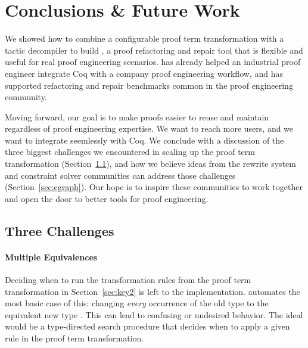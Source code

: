 \section{Conclusions \& Future Work}
\label{sec:discussion}

We showed how to combine a configurable proof term transformation with a tactic decompiler to build \toolname,
a proof refactoring and repair tool that is flexible and useful for real proof engineering scenarios.
\toolname has already helped an industrial proof engineer integrate Coq with a company proof engineering workflow,
and has supported refactoring and repair benchmarks common in the proof engineering community.

Moving forward, our goal is to make proofs easier to reuse and maintain regardless of proof engineering expertise.
We want to reach more users, and we want \toolname to integrate seemlessly with Coq.
We conclude with a discussion of the three biggest challenges we encountered in scaling up the \toolname proof term 
transformation (Section~\ref{sec:problems}), and how we believe ideas from the rewrite system and constraint
solver communities can address those challenges (Section~\ref{sec:egraph}).
Our hope is to inspire these communities to work together and open the door to better tools for proof engineering.

\subsection{Three Challenges}
\label{sec:problems}

\paragraph{Multiple Equivalences}

Deciding when to run the transformation rules from the proof term transformation in Section~\ref{sec:key2} is left to the implementation.
\toolname automates the most basic case of this: changing \textit{every} occurrence of the old type \A to the equivalent new type \B.
This can lead to confusing or undesired behavior.
The ideal would be a type-directed search procedure that decides when to apply a given rule in the proof term transformation.

